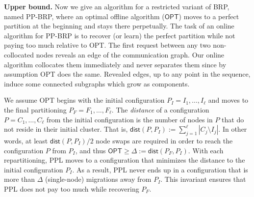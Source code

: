 \documentclass[manuscript,screen=true, review, anonymous]{acmart}
\newcommand{\OPT}{\textsf{OPT}\xspace}
\newcommand{\PPL}{\textsf{PPL}\xspace}
\newcommand{\OBRP}{BRP}
\newcommand{\PPOBRP}{PP-BRP}
\newcommand{\dist}{\textsf{dist}}
\newcommand\maciek[1]{\color{brown}\textbf{\\ Maciek: #1}\color{black}}
\begin{document}
\noindent \textbf{Upper bound.}
Now we give an algorithm for a restricted variant of  \OBRP{}, named \PPOBRP{},
where an optimal offline algorithm ($\OPT$) moves to a perfect partition
at the beginning and stays there perpetually.
The task of an online algorithm for \PPOBRP{} is to recover (or learn) the perfect partition while not paying too much relative to \OPT.
%
The first request between any two non-collocated nodes reveals an edge of the communication graph.
Our online algorithm collocates them immediately and never separates them since by assumption \OPT does the same.
Revealed edges, up to any point in the sequence,
induce some connected subgraphs which grow as components.

We assume \OPT begins with the initial configuration
$P_I = I_1, \dots, I_{\ell}$ and moves to the final partitioning
$P_F = F_1, \dots, F_{\ell}$.
 The \emph{distance} of a configuration $P = C_1, \dots, C_{\ell}$ from the initial configuration is the number of nodes in $P$ that do not reside in their initial cluster.
    That is,
    $\dist(P, P_I) := \sum_{j=1}^{\ell} | C_j \setminus I_j |$. 
In other words,
at least $\dist(P, P_I)/2$ node swaps are required in order to reach the configuration $P$ from $P_I$, and thus
$\OPT \geq \Delta:= \dist(P_F, P_I) $.
 With each repartitioning,
  \PPL moves to a configuration that minimizes the distance to the initial configuration $P_I$.
As a result,
\PPL never ends up in a configuration that is more than $\Delta$ (single-node) migrations away from $P_I$.
This invariant ensures that \PPL does not pay too much while recovering $P_F$.
\end{document}
